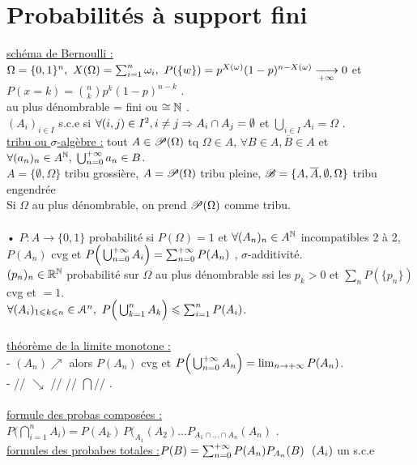 \documentclass[12 pt]{book}
\begin{document}
\section*{Probabilités à support fini}

\underline{schéma de Bernoulli :} $\Omega = \{0,1\}^n, \ X(\Omega) = \sum_{i=1}^n \omega_i , \ P(\{w\}) = p^{X(\omega)}(1-p)^{n-X(\omega)} \xrightarrow[+\infty]{} 0$ et $P(x =k) = \binom{n}{k} p^k (1-p)^{n-k}$ .\\
au plus dénombrable = fini ou $\cong \mathbb{N}$ .\\
$(A_i)_{i\in I}$ s.c.e si $\forall (i,j)\in I^2, i\neq j \Rightarrow A_i\cap A_j = \emptyset$ et $\bigcup_{i\in I} A_i = \Omega$ .\\
\underline{tribu ou $\sigma$-algèbre :} tout $A\in \mathscr{P}(\Omega)$ tq $\Omega\in A$, $\forall B\in A, \overline{B}\in A$ et $\forall(a_n)_n\in A^{\mathbb{N}}, \; \bigcup_{n=0}^{+\infty} a_n \in B$.\\
$A = \{\emptyset, \Omega\}$ tribu grossière, $A= \mathscr{P}(\Omega)$ tribu pleine, $ \mathscr{B} = \{A, \overline{A}, \emptyset, \Omega\}$ tribu engendrée\\
Si $\Omega$ au plus dénombrable, on prend $\mathscr{P}(\Omega)$ comme tribu.\\
\text{}\\
• $P : A \to \{0,1\}$ probabilité si $P(\Omega) = 1$ et $\forall (A_n)_n\in A^{\mathbb{N}}$ incompatibles 2 à 2, $P(A_n)$ cvg et $P\Big(\bigcup_{n=0}^{+\infty} A_i \Big) = \sum_{n=0}^{+\infty} P(A_n)$ , $\sigma$-additivité.\\
$(p_n)_n\in\mathbb{R}^{\mathbb{N}}$ probabilité sur $\Omega$ au plus dénombrable ssi les $p_k>0$ et $\sum_n P(\{p_n\})$ cvg et $=1$.\\
$\forall (A_i)_{1\leqslant k \leqslant n} \in \mathcal{A}^n, \ P\Big(\bigcup_{k=1}^n A_k \Big) \leqslant \sum_{i=1}^n P(A_i)$.\\
\newpage
\text{}\\
\underline{théorème de la limite monotone :}\\
- $(A_n) \nearrow$ alors $P(A_n)$ cvg et $P\Big(\bigcup_{n=0}^{+\infty} A_n \Big) = \lim_{n\to +\infty} P(A_n)$.\\
 - // \qquad $\searrow$ \qquad // \qquad // \qquad$\bigcap$\qquad // .\\
\text{}\\
\underline{formule des probas composées :} $P\Big(\bigcap_{i=1}^n A_i\Big) = P(A_k) \, P(_{A_1}(A_2) \dots P_{A_1 \cap \dots \cap A_n}(A_n)$ .\\
\underline{formules des probabes totales :}$P(B) = \sum_{n=0}^{+\infty} P(A_n)P_{A_n}(B) \  \ (A_i)$ un s.c.e\\
\end{document}
